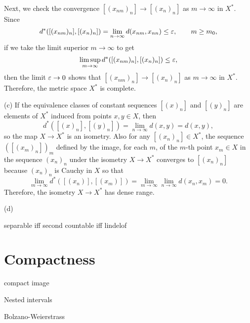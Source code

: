 \documentclass{../../large}
\begin{document}
\begin{pf}
Next, we check the convergence $[(x_{nm})_n]\to[(x_n)_n]$ as $m\to\infty$ in $X^*$.
Since
\[d^*([(x_{nm})_n],[(x_n)_n])=\lim_{n\to\infty}d(x_{nm},x_{nn})\le\varepsilon,\qquad m\ge m_0,\]
if we take the limit superior $m\to\infty$ to get
\[\limsup_{m\to\infty}d^*([(x_{nm})_n],[(x_n)_n])\le\varepsilon,\]
then the limit $\varepsilon\to0$ shows that $[(x_{nm})_n]\to[(x_n)_n]$ as $m\to\infty$ in $X^*$.
Therefore, the metric space $X^*$ is complete.

(c)
If the equivalence classes of constant sequences $[(x)_n]$ and $[(y)_n]$ are elements of $X^*$ induced from points $x,y\in X$, then
\[d^*([(x)_n],[(y)_n])=\lim_{n\to\infty}d(x,y)=d(x,y),\]
so the map $X\to X^*$ is an isometry.
Also for any $[(x_n)_n]\in X^*$, the sequence $([(x_m)_n])_m$ defined by the image, for each $m$, of the $m$-th point $x_m\in X$ in the sequence $(x_n)_n$ under the isometry $X\to X^*$ converges to $[(x_n)_n]$ because $(x_n)_n$ is Cauchy in $X$ so that
\[\lim_{m\to\infty}d^*([(x_n)],[(x_m)])=\lim_{m\to\infty}\lim_{n\to\infty}d(x_n,x_m)=0.\]
Therefore, the isometry $X\to X^*$ has dense range.

(d)
\end{pf}


\begin{prb}
separable iff second countable iff lindelof
\end{prb}


\section{Compactness}

\begin{prb}

compact image
\end{prb}

\begin{prb}
Nested intervals
\end{prb}

\begin{prb}
Bolzano-Weierstrass
\end{prb}

\begin{prb}
\end{prb}


\begin{prb}
\end{prb}
\end{document}
